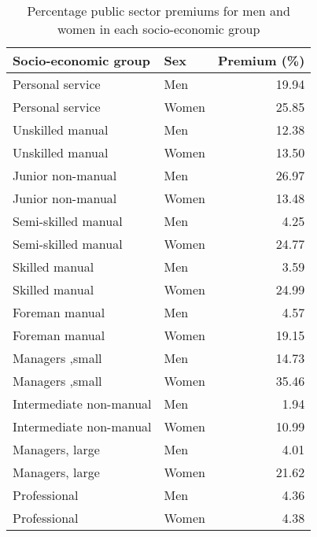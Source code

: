 \documentclass[a4paper,11pt,titlepage]{article}
\begin{document}
\begin{table}[ht]
\caption{Percentage public sector premiums for men and women in each socio-economic group \label{tab:baseprem}}
\begin{center}
\begin{tabular}{llr}
  \toprule
  Socio-economic group & Sex & Premium (\%) \\
  \midrule
   Personal service & Men & 19.94 \\
   Personal service & Women & 25.85 \\
   Unskilled manual & Men & 12.38 \\
   Unskilled manual & Women & 13.50 \\
   Junior non-manual & Men & 26.97 \\
   Junior non-manual & Women & 13.48 \\
   Semi-skilled manual & Men & 4.25 \\
   Semi-skilled manual & Women & 24.77 \\
   Skilled manual & Men & 3.59 \\
   Skilled manual & Women & 24.99 \\
   Foreman manual & Men & 4.57 \\
   Foreman manual & Women & 19.15 \\
   Managers ,small & Men & 14.73 \\
   Managers ,small & Women & 35.46 \\
   Intermediate non-manual& Men & 1.94 \\
   Intermediate non-manual & Women & 10.99 \\
   Managers, large & Men & 4.01 \\
   Managers, large & Women & 21.62 \\
   Professional & Men & 4.36 \\
   Professional & Women & 4.38 \\ 
\bottomrule
\end{tabular}
\end{center}
\end{table}
\end{document}
